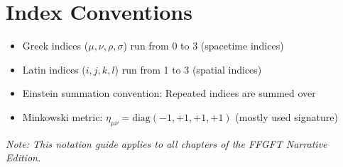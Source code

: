\vspace{1em}
\section*{Index Conventions}

\begin{itemize}
    \item Greek indices ($\mu, \nu, \rho, \sigma$) run from 0 to 3 (spacetime indices)
    \item Latin indices ($i, j, k, l$) run from 1 to 3 (spatial indices)
    \item Einstein summation convention: Repeated indices are summed over
    \item Minkowski metric: $\eta_{\mu\nu} = \text{diag}(-1, +1, +1, +1)$ (mostly used signature)
\end{itemize}

\vspace{1em}
\noindent\textit{Note: This notation guide applies to all chapters of the FFGFT Narrative Edition.}



